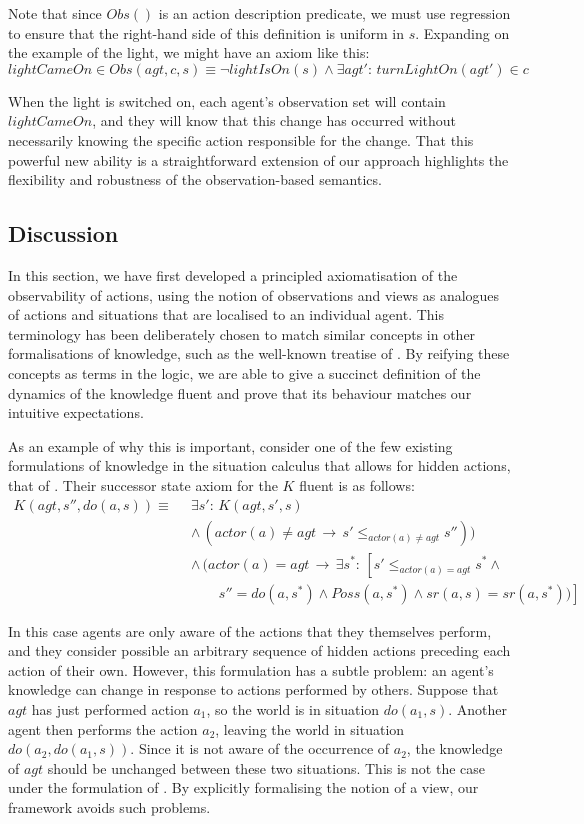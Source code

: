 Note that since $Obs()$ is an action description predicate, we must
use regression to ensure that the right-hand side of this definition
is uniform in $s$. Expanding on the example of the light, we might
have an axiom like this:\[
lightCameOn\in Obs(agt,c,s)\equiv\neg lightIsOn(s)\wedge\exists agt':\, turnLightOn(agt')\in c\]


When the light is switched on, each agent's observation set will contain
$lightCameOn$, and they will know that this change has occurred without
necessarily knowing the specific action responsible for the change.
That this powerful new ability is a straightforward extension of our
approach highlights the flexibility and robustness of the observation-based
semantics.


\subsection{Discussion}

In this section, we have first developed a principled axiomatisation
of the observability of actions, using the notion of observations
and views as analogues of actions and situations that are localised
to an individual agent. This terminology has been deliberately chosen
to match similar concepts in other formalisations of knowledge, such
as the well-known treatise of \citet{halpern90knowledge_distrib}.
By reifying these concepts as terms in the logic, we are able to give
a succinct definition of the dynamics of the knowledge fluent and
prove that its behaviour matches our intuitive expectations.

As an example of why this is important, consider one of the few existing
formulations of knowledge in the situation calculus that allows for
hidden actions, that of \citep{Lesperance99sitcalc_approach}. Their
successor state axiom for the $K$ fluent is as follows:\begin{align*}
K(agt,s'',do(a,s))\equiv\,\,\, & \exists s':\, K(agt,s',s)\\
 & \wedge\,(actor(a)\neq agt\,\rightarrow\, s'\leq_{actor(a)\neq agt}s''))\\
 & \wedge\,(actor(a)=agt\,\rightarrow\,\exists s^{*}:\,\left[s'\leq_{actor(a)=agt}s^{*}\wedge\right.\\
 & \,\,\,\,\,\,\,\,\,\,\,\,\left.s''=do(a,s^{*})\wedge Poss(a,s^{*})\wedge sr(a,s)=sr(a,s^{*}))\right]\end{align*}
 

In this case agents are only aware of the actions that they themselves
perform, and they consider possible an arbitrary sequence of hidden
actions preceding each action of their own. However, this formulation
has a subtle problem: an agent's knowledge can change in response
to actions performed by others. Suppose that $agt$ has just performed
action $a_{1}$, so the world is in situation $do(a_{1},s)$. Another
agent then performs the action $a_{2}$, leaving the world in situation
$do(a_{2},do(a_{1},s))$. Since it is not aware of the occurrence
of $a_{2}$, the knowledge of $agt$ should be unchanged between these
two situations. This is not the case under the formulation of \citeauthor{Lesperance99sitcalc_approach}.
By explicitly formalising the notion of a view, our framework avoids
such problems.

